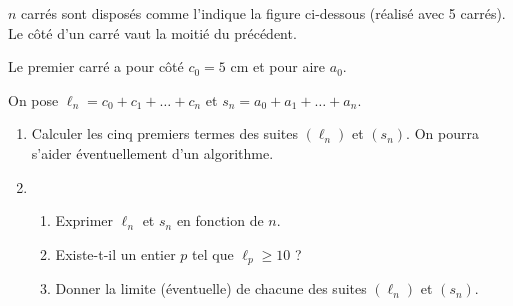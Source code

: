 \documentclass[11pt]{article}
\begin{document}
\begin{exercice}
$n$ carrés sont disposés comme l’indique la figure ci-dessous (réalisé avec 5 carrés). Le côté d’un carré vaut la moitié du précédent.

Le premier carré a pour côté $c_0 = 5$ cm et pour aire $a_0$.

On pose $\ell_n = c_0 + c_1 + \dots + c_n$ et $s_n = a_0 + a_1 + \dots + a_n$.

\begin{center}

\end{center}

\begin{enumerate}
    \item Calculer les cinq premiers termes des suites $(\ell_n)$ et $(s_n)$. On pourra s’aider éventuellement d’un algorithme.
    \item 
    \begin{enumerate}
        \item Exprimer $\ell_n$ et $s_n$ en fonction de $n$.
        \item Existe-t-il un entier $p$ tel que $\ell_p \geq 10$ ?
        \item Donner la limite (éventuelle) de chacune des suites $(\ell_n)$ et $(s_n)$.
    \end{enumerate}
\end{enumerate}
\end{exercice}
\end{document}
